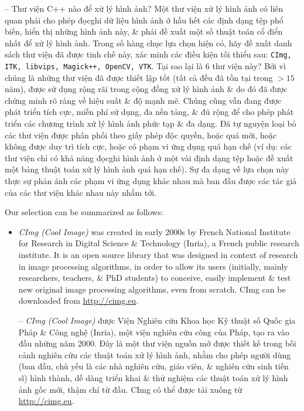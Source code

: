 \documentclass{article}
\begin{document}
\begin{itemize}
\begin{itemize}
        -- {\sf Thư viện C++ nào để xử lý hình ảnh?} Một thư viện xử lý hình ảnh có liên quan phải cho phép đọc{\tt}ghi dữ liệu hình ảnh ở hầu hết các định dạng tệp phổ biến, hiển thị những hình ảnh này, \& phải đề xuất một số thuật toán cổ điển nhất để xử lý hình ảnh. Trong số hàng chục lựa chọn hiện có, hãy đề xuất danh sách thư viện đã được tinh chế này, xác minh các điều kiện tối thiểu sau: {\tt CImg, ITK, libvips, Magick++, OpenCV, VTK}. Tại sao lại là 6 thư viện này? Bởi vì chúng là những thư viện đã được thiết lập tốt (tất cả đều đã tồn tại trong $> 15$ năm), được sử dụng rộng rãi trong cộng đồng xử lý hình ảnh \& do đó đã được chứng minh rõ ràng về hiệu suất \& độ mạnh mẽ. Chúng cũng vẫn đang được phát triển tích cực, miễn phí sử dụng, đa nền tảng, \& đủ rộng để cho phép phát triển các chương trình xử lý hình ảnh phức tạp \& đa dạng. Đã tự nguyện loại bỏ các thư viện được phân phối theo giấy phép độc quyền, hoặc quá mới, hoặc không được duy trì tích cực, hoặc có phạm vi ứng dụng quá hạn chế (ví dụ: các thư viện chỉ có khả năng đọc{\tt}ghi hình ảnh ở một vài định dạng tệp hoặc đề xuất một bảng thuật toán xử lý hình ảnh quá hạn chế). Sự đa dạng về lựa chọn này thực sự phản ánh các phạm vi ứng dụng khác nhau mà ban đầu được các tác giả của các thư viện khác nhau này nhắm tới.
        
        Our selection can be summarized as follows:
        \begin{itemize}
            \item {\it CImg (Cool Image)} was created in early 2000s by French National Institute for Research in Digital Science \& Technology (Inria), a French public research institute. It is an open source library that was designed in context of research in image processing algorithms, in order to allow its users (initially, mainly researchers, teachers, \& PhD students) to conceive, easily implement \& test new original image processing algorithms, even from scratch. CImg can be downloaded from \url{http://cimg.eu}.
            
            -- {\it CImg (Cool Image)} được Viện Nghiên cứu Khoa học Kỹ thuật số Quốc gia Pháp \& Công nghệ (Inria), một viện nghiên cứu công của Pháp, tạo ra vào đầu những năm 2000. Đây là một thư viện nguồn mở được thiết kế trong bối cảnh nghiên cứu các thuật toán xử lý hình ảnh, nhằm cho phép người dùng (ban đầu, chủ yếu là các nhà nghiên cứu, giáo viên, \& nghiên cứu sinh tiến sĩ) hình thành, dễ dàng triển khai \& thử nghiệm các thuật toán xử lý hình ảnh gốc mới, thậm chí từ đầu. CImg có thể được tải xuống từ \url{http://cimg.eu}.
            

\end{itemize}
\end{itemize}
\end{itemize}
\end{document}
